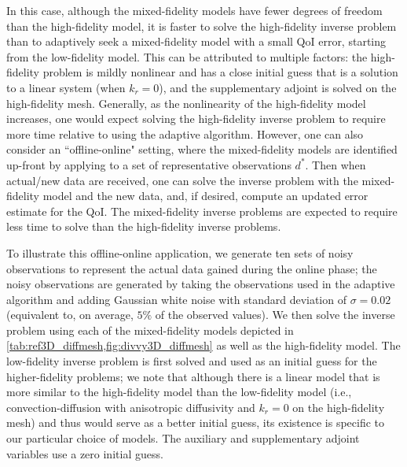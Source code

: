In this case, although the mixed-fidelity models have fewer degrees of freedom than the high-fidelity model, it is faster to solve the high-fidelity inverse problem than to adaptively seek a mixed-fidelity model with a small QoI error, starting from the low-fidelity model. This can be attributed to multiple factors: the high-fidelity problem is mildly nonlinear and has a close initial guess that is a solution to a linear system (when $k_r=0$), and the supplementary adjoint is solved on the high-fidelity mesh. Generally, as the nonlinearity of the high-fidelity model increases, one would expect solving the high-fidelity inverse problem to require more time relative to using the adaptive algorithm. However, one can also consider an ``offline-online" setting, where the mixed-fidelity models are identified up-front by applying  to a set of representative observations $d^*$. Then when actual/new data are received, one can solve the inverse problem with the mixed-fidelity model and the new data, and, if desired, compute an updated error estimate for the QoI. The mixed-fidelity inverse problems are expected to require less time to solve than the high-fidelity inverse problems.

To illustrate this offline-online application, we generate ten sets of noisy observations to represent the actual data gained during the online phase; the noisy observations are generated by taking the observations used in the adaptive algorithm and adding Gaussian white noise with standard deviation of $\sigma=0.02$ (equivalent to, on average, $5\%$ of the observed values). We then solve the inverse problem using each of the mixed-fidelity models depicted in \cref{tab:ref3D_diffmesh,fig:divvy3D_diffmesh} as well as the high-fidelity model. The low-fidelity inverse problem is first solved and used as an initial guess for the higher-fidelity problems; we note that although there is a linear model that is more similar to the high-fidelity model than the low-fidelity model (i.e., convection-diffusion with anisotropic diffusivity and $k_r=0$ on the high-fidelity mesh) and thus would serve as a better initial guess, its existence is specific to our particular choice of models. The auxiliary and supplementary adjoint variables use a zero initial guess.

